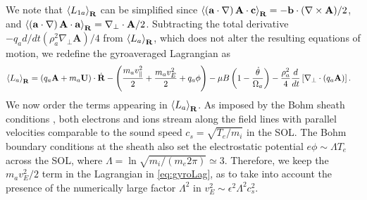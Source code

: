We note that $\left< L_{1a} \right>_{\mathbf R}$ can be simplified since $\left< \left(\mathbf a \cdot \nabla\right) \mathbf A \cdot \mathbf c \right>_{\mathbf R} = -\mathbf b \cdot (\nabla \times \mathbf A) /2$, and $\left< \left(\mathbf a \cdot \nabla\right) \mathbf A \cdot \mathbf a \right>_{\mathbf R} = \nabla_\perp\cdot\mathbf{A}/2$. Subtracting the total derivative $-q_a d/dt(\rho_a^2 \nabla_\perp \mathbf A)/4$ from $\left< L_a \right>_{\mathbf R}$, which does not alter the resulting equations of motion, we redefine the gyroaveraged Lagrangian as
%
\begin{equation}
    \begin{split}
        \left< L_a \right>_{\mathbf R} &= \left(q_a\mathbf A + m_a{\mathbf U}\right) \cdot \dot{\mathbf R}  - \left(\frac{m_a v_\parallel^2}{2}+\frac{m_a v_E^2}{2} + q_a \phi\right)-\mu B\left(1- \frac{\dot \theta}{\Omega_a}\right)
        -\frac{\rho_a^2}{4}\frac{d }{dt}\left[\nabla_\perp\cdot\left(q_a \mathbf A\right)\right].
    \end{split}
    \label{eq:gyroLag}
\end{equation}
%
We now order the terms appearing in $\left< L_a \right>_{\mathbf R}$.
As imposed by the Bohm sheath conditions \citep{Stangeby2000}, both electrons and ions stream along the field lines with parallel velocities comparable to the sound speed $c_s = \sqrt{T_e/m_i}$ in the SOL.
The Bohm boundary conditions at the sheath also set the electrostatic potential $e \phi \sim \Lambda T_e$ across the SOL, where $\Lambda = \ln \sqrt{m_i/(m_e 2\pi)}\simeq 3$.
Therefore, we keep the $m_a v_E^2/2$ term in the Lagrangian in \cref{eq:gyroLag}, as to take into account the presence of the numerically large factor $\Lambda^2$ in $v_E^2 \sim \epsilon^2 \Lambda^2 c_s^2$.


